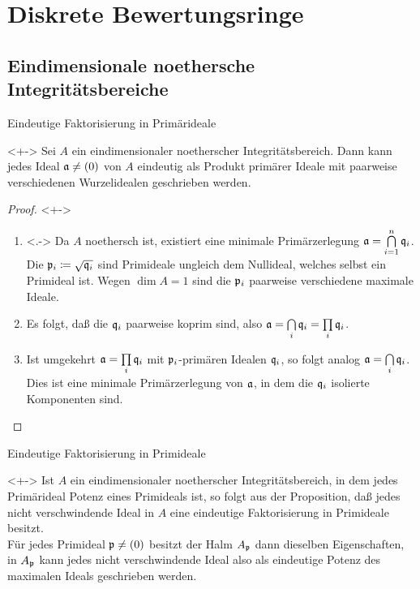 \section{Diskrete Bewertungsringe}

\subsection{Eindimensionale noethersche Integritätsbereiche}

\begin{frame}{Eindeutige Faktorisierung in Primärideale}
	\begin{proposition}<+->
		Sei \(A\) ein eindimensionaler noetherscher Integritätsbereich. Dann kann
		jedes Ideal \(\mathfrak{a} \neq (0)\) von \(A\) eindeutig als Produkt primärer
		Ideale mit paarweise verschiedenen Wurzelidealen geschrieben werden.
	\end{proposition}
	\begin{proof}<+->
		\begin{enumerate}[<+->]
		\item<.->
			Da \(A\) noethersch ist, existiert eine  minimale Primärzerlegung
			\(\mathfrak{a} = \bigcap\limits_{i = 1}^n \mathfrak{q}_i\). Die \(\mathfrak{p}_i
			\coloneqq \sqrt{\mathfrak{q}_i}\) sind Primideale ungleich dem Nullideal, welches
			selbst ein Primideal ist. Wegen \(\dim A = 1\) sind die
			\(\mathfrak{p}_i\) paarweise verschiedene maximale Ideale.
		\item
			Es folgt, daß die \(\mathfrak{q}_i\) paarweise koprim sind, also
			\(\mathfrak{a} = \bigcap\limits_i \mathfrak{q}_i = \prod\limits_i \mathfrak{q}_i\).
		\item
			Ist umgekehrt \(\mathfrak{a} = \prod\limits_i \mathfrak{q}_i\) mit
			\(\mathfrak{p}_i\)-primären Idealen \(\mathfrak{q}_i\), so folgt analog \(\mathfrak{a} = \bigcap\limits_i \mathfrak{q}_i\).
			Dies ist eine minimale Primärzerlegung von \(\mathfrak{a}\), in dem die
			\(\mathfrak{q}_i\) isolierte Komponenten sind.
			\qedhere
		\end{enumerate}
	\end{proof}
\end{frame}

\begin{frame}{Eindeutige Faktorisierung in Primideale}
	\begin{remark}<+->
		Ist \(A\) ein eindimensionaler noetherscher Integritätsbereich, in dem jedes Primärideal
		Potenz eines Primideals ist, so folgt aus der Proposition, daß jedes nicht verschwindende
		Ideal in \(A\) eine eindeutige Faktorisierung in Primideale besitzt.
		\\
		Für jedes Primideal \(\mathfrak{p} \neq (0)\) besitzt der Halm \(A_{\mathfrak{p}}\) dann dieselben
		Eigenschaften, in \(A_{\mathfrak{p}}\) kann jedes nicht verschwindende Ideal also als eindeutige
		Potenz des maximalen Ideals geschrieben werden.
	\end{remark}
\end{frame}

